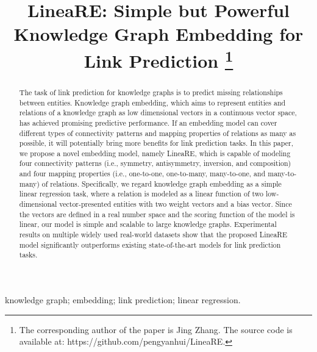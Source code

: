 \documentclass[conference]{IEEEtran}
\begin{document}
\title{
	LineaRE: Simple but Powerful Knowledge Graph Embedding for Link Prediction
	\thanks{The corresponding author of the paper is Jing Zhang. The source code is available at: https://github.com/pengyanhui/LineaRE.}
}

\author{
}

\maketitle


\begin{abstract}
The task of link prediction for knowledge graphs is to predict missing relationships between entities. Knowledge graph embedding, which aims to represent entities and relations of a knowledge graph as low dimensional vectors in a continuous vector space, has achieved promising predictive performance. If an embedding model can cover different types of connectivity patterns and mapping properties of relations as many as possible, it will potentially bring more benefits for link prediction tasks. In this paper, we propose a novel embedding model, namely LineaRE, which is capable of modeling four connectivity patterns (i.e., symmetry, antisymmetry, inversion, and composition) and four mapping properties (i.e., one-to-one, one-to-many, many-to-one, and many-to-many) of relations. Specifically, we regard knowledge graph embedding as a simple linear regression task, where a relation is modeled as a linear function of two low-dimensional vector-presented entities with two weight vectors and a bias vector. Since the vectors are defined in a real number space and the scoring function of the model is linear, our model is simple and scalable to large knowledge graphs. Experimental results on multiple widely used real-world datasets show that the proposed LineaRE model significantly outperforms existing state-of-the-art models for link prediction tasks.
\end{abstract}

\begin{IEEEkeywords}
	knowledge graph; embedding; link prediction; linear regression.
\end{IEEEkeywords}
\end{document}
